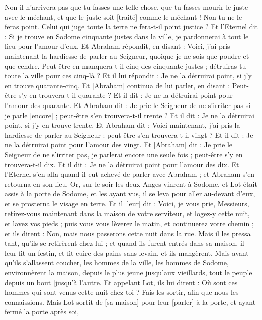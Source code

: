 \begin{multicols}{2}
Non il n'arrivera pas que tu fasses une telle chose, que tu fasses mourir le juste avec le méchant, et que le juste soit [traité] comme le méchant ! Non tu ne le feras point. Celui qui juge toute la terre ne fera-t-il point justice ?
Et l'Eternel dit : Si je trouve en Sodome cinquante justes dans la ville, je pardonnerai à tout le lieu pour l'amour d'eux.
Et Abraham répondit, en disant : Voici, j'ai pris maintenant la hardiesse de parler au Seigneur, quoique je ne sois que poudre et que cendre.
Peut-être en manquera-t-il cinq des cinquante justes ; détruiras-tu toute la ville pour ces cinq-là ? Et il lui répondit : Je ne la détruirai point, si j'y en trouve quarante-cinq.
Et [Abraham] continua de lui parler, en disant : Peut-être s'y en trouvera-t-il quarante ? Et il dit : Je ne la détruirai point pour l'amour des quarante.
Et Abraham dit : Je prie le Seigneur de ne s'irriter pas si je parle [encore] ; peut-être s'en trouvera-t-il trente ? Et il dit : Je ne la détruirai point, si j'y en trouve trente.
Et Abraham dit : Voici maintenant, j'ai pris la hardiesse de parler au Seigneur : peut-être s'en trouvera-t-il vingt ? Et il dit : Je ne la détruirai point pour l'amour des vingt.
Et [Abraham] dit : Je prie le Seigneur de ne s'irriter pas, je parlerai encore une seule fois ; peut-être s'y en trouvera-t-il dix. Et il dit : Je ne la détruirai point pour l'amour des dix.
Et l'Eternel s'en alla quand il eut achevé de parler avec Abraham ; et Abraham s'en retourna en son lieu.
\VerseOne{}Or, sur le soir les deux Anges vinrent à Sodome, et Lot était assis à la porte de Sodome, et les ayant vus, il se leva pour aller au-devant d'eux, et se prosterna le visage en terre.
Et il [leur] dit : Voici, je vous prie, Messieurs, retirez-vous maintenant dans la maison de votre serviteur, et logez-y cette nuit, et lavez vos pieds ; puis vous vous lèverez le matin, et continuerez votre chemin ; et ils dirent : Non, mais nous passerons cette nuit dans la rue.
Mais il les pressa tant, qu'ils se retirèrent chez lui ; et quand ils furent entrés dans sa maison, il leur fit un festin, et fit cuire des pains sans levain, et ils mangèrent.
Mais avant qu'ils s'allassent coucher, les hommes de la ville, les hommes de Sodome, environnèrent la maison, depuis le plus jeune jusqu'aux vieillards, tout le peuple depuis un bout [jusqu'à l'autre.
Et appelant Lot, ils lui dirent : Où sont ces hommes qui sont venus cette nuit chez toi ? Fais-les sortir, afin que nous les connaissions.
Mais Lot sortit de [sa maison] pour leur [parler] à la porte, et ayant fermé la porte après soi,

\end{multicols}

